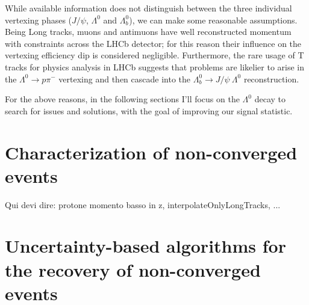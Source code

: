 While available information does not distinguish between the three individual vertexing phases ($J/\psi$, $\Lambda^0$ and $\Lambda_b^0$), we can make some reasonable assumptions.
Being Long tracks, muons and antimuons have well reconstructed momentum with constraints across the LHCb detector;
for this reason their influence on the vertexing efficiency dip is considered negligible.
Furthermore, the rare usage of T tracks for physics analysis in LHCb suggests that problems are likelier to arise in the $\Lambda^0 \rightarrow p\pi^-$ vertexing and then cascade into the $\Lambda_b^0 \rightarrow J/\psi~\Lambda^0$ reconstruction.

For the above reasons, in the following sections I'll focus on the $\Lambda^0$ decay to search for issues and solutions, with the goal of improving our signal statistic. %


\section{Characterization of non-converged events}
Qui devi dire: protone momento basso in z, interpolateOnlyLongTracks, ...

\section{Uncertainty-based algorithms for the recovery of non-converged events}
